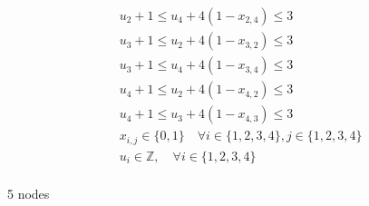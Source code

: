 \documentclass[../open-optimization/open-optimization.tex]{subfiles}
\begin{document}
\begin{example}{}{}
\begin{align*}
 & u_{2} +1 \leq u_{4} + 4 (1-x_{2,4}) \leq 3\\
 & u_{3} +1 \leq u_{2} + 4 (1-x_{3,2}) \leq 3\\
 & u_{3} +1 \leq u_{4} + 4 (1-x_{3,4}) \leq 3\\
 & u_{4} +1 \leq u_{2} + 4 (1-x_{4,2}) \leq 3\\
 & u_{4} +1 \leq u_{3} + 4 (1-x_{4,3}) \leq 3\\
 & x_{i,j} \in \{0,1\} \quad\forall i\in \{1,2,3,4\}, j \in \{1,2,3,4\}\\
 & u_{i} \in \mathbb{Z}, \quad\forall i \in \{1,2,3,4\}\\
\end{align*}
\end{example}


\begin{example}{5 nodes}


\end{example}
\end{document}
